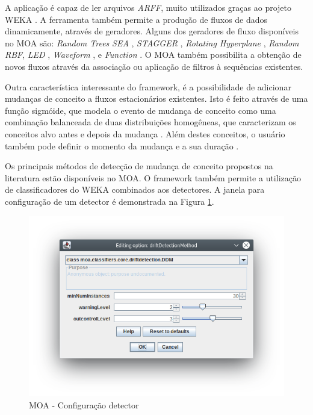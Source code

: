 \documentclass[qual, classic, a4paper]{ufbathesis}
\begin{document}
A aplicação é capaz de ler arquivos \textit{ARFF}, muito utilizados graças ao projeto WEKA \cite{Hall:2009:WDM:1656274.1656278}.
A ferramenta também permite a produção de fluxos de dados dinamicamente, através de geradores.
Alguns dos geradores de fluxo disponíveis no MOA são:
\textit{Random Trees} \cite{Domingos:2000:MHD:347090.347107}
\textit{SEA} \cite{Street:2001:SEA:502512.502568}, 
\textit{STAGGER} \cite{Schlimmer1986}, 
\textit{Rotating Hyperplane} \cite{Wang:2003:MCD:956750.956778},
\textit{Random RBF}, 
\textit{LED} \cite{Gama:2003:ADT:956750.956813}, 
\textit{Waveform} \cite{Gama:2003:ADT:956750.956813}, 
 e \textit{Function} \cite{Jin:2003:EDT:956750.956821}.
O MOA também possibilita a obtenção de novos fluxos através da associação ou aplicação de filtros à sequências existentes.

Outra característica interessante do framework, é a possibilidade de adicionar mudanças de conceito a fluxos estacionários existentes.
Isto é feito através de uma função sigmóide, que modela o evento de mudança de conceito como uma combinação balanceada de duas distribuições homogêneas, 
que caracterizam os conceitos alvo antes e depois da mudança \cite{bifet2009data}.
Além destes conceitos, o usuário também pode definir o momento da mudança e a sua duração \cite{Bifet:2010:MMO:1756006.1859903}.

Os principais métodos de detecção de mudança de conceito propostos na literatura estão disponíveis no MOA.
O framework também permite a utilização de classificadores do WEKA \cite{Hall:2009:WDM:1656274.1656278} combinados aos detectores.
A janela para configuração de um detector é demonstrada na Figura \ref{fig:moa_detector}.

\begin{figure}[!ht]
\begin{center}
    \includegraphics[scale=1]{imagens/detector.png}
    \caption{MOA - Configuração detector}
    \label{fig:moa_detector}
\end{center}
\end{figure}
\end{document}

